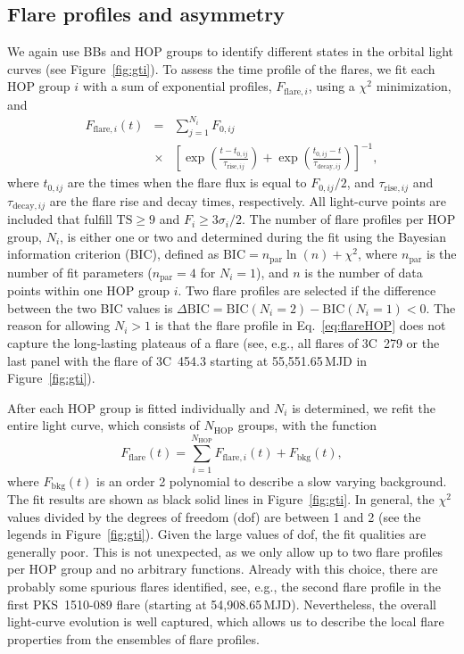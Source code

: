 \documentclass[twocolumn]{aastex62}
\begin{document}
\subsection{Flare profiles and asymmetry}
\label{sec:flare-profile}
We again use BBs and HOP groups to identify different states in 
the orbital light curves (see Figure~\ref{fig:gti}). 
To assess the time profile of the flares,
we fit each HOP group $i$ with a sum of exponential profiles, $F_{\mathrm{flare},i}$,
using a $\chi^2$ minimization, and
\begin{eqnarray}
    F_{\mathrm{flare},i}(t) &=& 
    \sum\limits_{j = 1}^{N_i} F_{0,ij}\nonumber\\
    &\times&\left[\exp\left(\frac{t - t_{0,ij}}{\tau_{\mathrm{rise},ij}}\right) + \exp
    \left(\frac{t_{0,ij} - t}{\tau_{\mathrm{decay},ij}}\right)\right]^{-1}\!\!\!,
    \label{eq:flareHOP}
\end{eqnarray}
where $t_{0,ij}$ are the times when the flare flux is equal to $F_{0,ij} / 2$, and $\tau_{\mathrm{rise},ij}$ and $\tau_{\mathrm{decay},ij}$ are the flare rise and decay times, respectively.
All light-curve points are included that fulfill $\mathrm{TS}\geqslant9$ and $F_i \geqslant 3\sigma_i/2 $.
The number of flare profiles per HOP group, $N_i$, is either one or two and determined during the fit using the Bayesian information criterion (BIC), defined as $\mathrm{BIC} = n_\mathrm{par}\ln(n) + \chi^2$, where $n_\mathrm{par}$ is the number of fit parameters ($n_\mathrm{par} = 4$ for $N_i = 1$), and $n$ is the number of data points within one HOP group $i$. 
Two flare profiles are selected if the difference between the two BIC values is $\Delta\mathrm{BIC} = \mathrm{BIC}(N_i = 2) - \mathrm{BIC}(N_i = 1) < 0$.
The reason for allowing $N_i > 1$ is that the flare profile in Eq.~\ref{eq:flareHOP} does not capture the long-lasting plateaus of a flare (see, e.g., all flares of 3C~279 or the last panel with the flare of 3C~454.3 starting at 55,551.65\,MJD in Figure~\ref{fig:gti}).

After each HOP group is fitted individually and $N_i$ is determined, 
we refit the entire light curve, which consists of $N_\mathrm{HOP}$ groups, with the function 
\begin{equation}
    F_\mathrm{flare}(t) = \sum\limits_{i = 1}^{N_\mathrm{HOP}}F_{\mathrm{flare},i}(t) + F_\mathrm{bkg}(t),
\end{equation}
where $F_\mathrm{bkg}(t)$ is an order 2 polynomial to describe a slow  varying background.
The fit results are shown as black solid lines in Figure~\ref{fig:gti}.
In general, the $\chi^2$ values divided by the degrees of freedom (dof) are between 1 and 2 (see the legends in Figure~\ref{fig:gti}). Given the large values of dof, the fit qualities are generally poor. This is not unexpected, as we only allow up to two flare profiles per HOP group and no arbitrary functions. Already with this choice, there are probably some spurious flares identified, see, e.g., the second flare profile in the first PKS~1510-089 flare (starting at 54,908.65\,MJD). 
Nevertheless, the overall light-curve evolution is well captured, which allows us to describe the local flare properties from the ensembles of flare profiles. %
\end{document}
